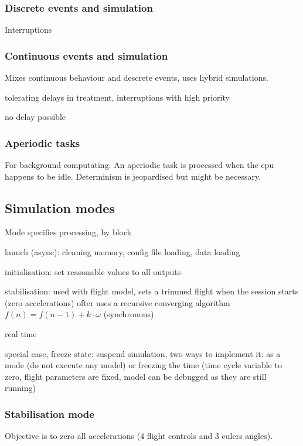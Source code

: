 \documentclass[10pt]{article}
\theoremstyle{plain}
\theoremstyle{definition}
\theoremstyle{remark}
\begin{document}
\subsubsection{Discrete events and simulation}
Interruptions

\subsubsection{Continuous events and simulation}
Mixes continuous behaviour and descrete events, uses hybrid simulations.
\begin{compactitem}
	\item tolerating delays in treatment, interruptions with high priority
	\item no delay possible
\end{compactitem}

\subsubsection{Aperiodic tasks}
For background computating. An aperiodic task is processed when the cpu happens
to be idle. Determinism is jeopardised but might be necessary.

\subsection{Simulation modes}
Mode specifies processing, by block
\begin{compactitem}
	\item launch (async): cleaning memory, config file loading, data loading
	\item initialisation: set reasonable values to all outputs
	\item stabilisation: used with flight model, sets a trimmed flight when
		the session starts (zero accelerations) ofter uses a recursive
		converging algorithm \( f(n) = f(n-1) + k\cdot \omega \) (synchronous)
	\item real time
	\item special case, freeze state: suspend simulation, two ways to implement
		it: as a mode (do not execute any model) or freezing the time (time
		cycle variable to zero, flight parameters are fixed, model can be
		debugged as they are still running)
\end{compactitem}

\subsubsection{Stabilisation mode}
Objective is to zero all accelerations (4 flight controls and 3 eulers angles).
\end{document}
